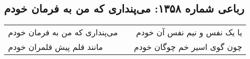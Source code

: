 \begin{center}
\section*{رباعی شماره ۱۳۵۸: می‌پنداری که من به فرمان خودم}
\label{sec:1358}
\begin{longtable}{l p{0.5cm} r}
می‌پنداری که من به فرمان خودم
&&
یا یک نفس و نیم نفس آن خودم
\\
مانند قلم پیش قلمران خودم
&&
چون گوی اسیر خم چوگان خودم
\\
\end{longtable}
\end{center}

